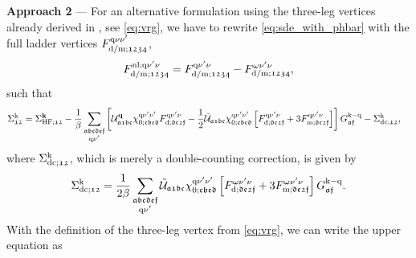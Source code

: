 \documentclass[\main/main.tex]{subfiles}
\begin{document}
\\\\
\textbf{Approach 2} --- For an alternative formulation using the three-leg vertices already derived in , see \eqref{eq:vrg}, we have to rewrite \eqref{eq:sde_with_phbar} with the full ladder vertices $F^{\text{q}\nu\nu'}_{\text{d}/\text{m};\mathfrak{1234}}$,
\begin{align}
	F^{\text{nl};\text{q}\nu'\nu}_{\text{d}/\text{m};\mathfrak{1234}}=F^{\text{q}\nu'\nu}_{\text{d}/\text{m};\mathfrak{1234}}-F^{\omega\nu'\nu}_{\text{d}/\text{m};\mathfrak{1234}},
\end{align}
such that
\begin{align}
	\Sigma^{\text{k}}_{\mathfrak{12}}&=\Sigma_{\text{HF};\mathfrak{12}}^{\textbf{k}} -\frac1\beta\sum_{\substack{\mathfrak{abcdef}\\\text{q}\nu'}}\left [\mathcal{U}^{\textbf{q}}_{\mathfrak{a1bc}}\chi^{\text{q}\nu'\nu'}_{0;\mathfrak{cbed}} F^{\text{q}\nu'\nu}_{\text{d};\mathfrak{de2f}}-\frac12\tilde{\mathcal{U}}_{\mathfrak{a1bc}}\chi^{\text{q}\nu'\nu'}_{0;\mathfrak{cbed}}\left [F^{\text{q}\nu'\nu}_{\text{d};\mathfrak{de2f}}+3 F^{\text{q}\nu'\nu}_{\text{m};\mathfrak{de2f}}\right ]\right ]G_{\mathfrak{af}}^{\text{k}-\text{q}} - \Sigma^{\text{k}}_{\text{dc};\mathfrak{12}},
\end{align}
where $\Sigma^{\text{k}}_{\text{dc};\mathfrak{12}}$, which is merely a double-counting correction, is given by
\begin{align}
	\Sigma^{\text{k}}_{\text{dc};\mathfrak{12}} = \frac{1}{2\beta}\sum_{\substack{\mathfrak{abcdef}\\\text{q}\nu'}}\tilde{\mathcal{U}}_{\mathfrak{a1bc}}\chi^{\text{q}\nu'\nu'}_{0;\mathfrak{cbed}}\left [F^{\omega\nu'\nu}_{\text{d};\mathfrak{de2f}}+3 F^{\omega\nu'\nu}_{\text{m};\mathfrak{de2f}}\right ]G_{\mathfrak{af}}^{\text{k}-\text{q}}.
\end{align}
With the definition of the three-leg vertex from \eqref{eq:vrg}, we can write the upper equation as
\end{document}
